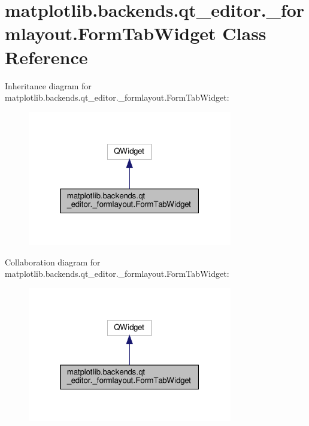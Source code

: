 \hypertarget{classmatplotlib_1_1backends_1_1qt__editor_1_1__formlayout_1_1FormTabWidget}{}\section{matplotlib.\+backends.\+qt\+\_\+editor.\+\_\+formlayout.\+Form\+Tab\+Widget Class Reference}
\label{classmatplotlib_1_1backends_1_1qt__editor_1_1__formlayout_1_1FormTabWidget}


Inheritance diagram for matplotlib.\+backends.\+qt\+\_\+editor.\+\_\+formlayout.\+Form\+Tab\+Widget\+:
\nopagebreak
\begin{figure}[H]
\begin{center}
\leavevmode
\includegraphics[width=253pt]{classmatplotlib_1_1backends_1_1qt__editor_1_1__formlayout_1_1FormTabWidget__inherit__graph}
\end{center}
\end{figure}


Collaboration diagram for matplotlib.\+backends.\+qt\+\_\+editor.\+\_\+formlayout.\+Form\+Tab\+Widget\+:
\nopagebreak
\begin{figure}[H]
\begin{center}
\leavevmode
\includegraphics[width=253pt]{classmatplotlib_1_1backends_1_1qt__editor_1_1__formlayout_1_1FormTabWidget__coll__graph}
\end{center}
\end{figure}
